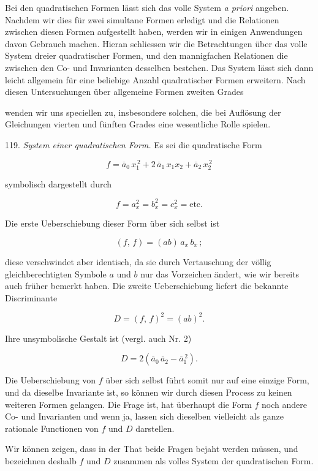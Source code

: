 \documentclass[11pt]{article}
\providecommand{\weberpage}[1]{}
\begin{document}
Bei den quadratischen Formen lässt sich das volle System \textit{a priori}
angeben. Nachdem wir dies für zwei simultane Formen erledigt und
die Relationen zwischen diesen Formen aufgestellt haben, werden wir
in einigen Anwendungen davon Gebrauch machen. Hieran schliessen
wir die Betrachtungen über das volle System dreier quadratischer
Formen, und den mannigfachen Relationen die zwischen den Co- und
Invarianten desselben bestehen. Das System lässt sich dann leicht
allgemein für eine beliebige Anzahl quadratischer Formen erweitern.
Nach diesen Untersuchungen über allgemeine Formen zweiten Grades


\weberpage{136}
wenden wir uns speciellen zu, insbesondere solchen, die bei Auflösung
der Gleichungen vierten und fünften Grades eine wesentliche Rolle
spielen.

119. \textit{System einer quadratischen Form.} Es sei die quadratische
Form

\[
f = \overline{a}_0\,x_1^{\,2} + 2\,\overline{a}_1\,x_1 x_2 + \overline{a}_2\,x_2^{\,2}
\]

symbolisch dargestellt durch

\[
f = a_x^2 = b_x^2 = c_x^2 = \text{etc.}
\]

Die erste Ueberschiebung dieser Form über sich selbst ist

\[
(f,\,f) = (ab)\,a_x\,b_x\,;
\]

diese verschwindet aber identisch, da sie durch Vertauschung der völlig
gleichberechtigten Symbole $a$ und $b$ nur das Vorzeichen ändert, wie
wir bereits auch früher bemerkt haben. Die zweite Ueberschiebung
liefert die bekannte Discriminante

\[
D = (f,\,f)^2 = (ab)^2.
\]

Ihre unsymbolische Gestalt ist (vergl. auch Nr. 2)

\[
D = 2(\overline{a}_0\,\overline{a}_2 - \overline{a}_1^{\,2}).
\]

Die Ueberschiebung von $f$ über sich selbst führt somit nur auf eine
einzige Form, und da dieselbe Invariante ist, so können wir durch
diesen Process zu keinen weiteren Formen gelangen. Die Frage ist,
hat überhaupt die Form $f$ noch andere Co- und Invarianten und wenn
ja, lassen sich dieselben vielleicht als ganze rationale Functionen von
$f$ und $D$ darstellen.

Wir können zeigen, dass in der That beide Fragen bejaht werden
müssen, und bezeichnen deshalb $f$ und $D$ zusammen als volles System
der quadratischen Form.
\end{document}
